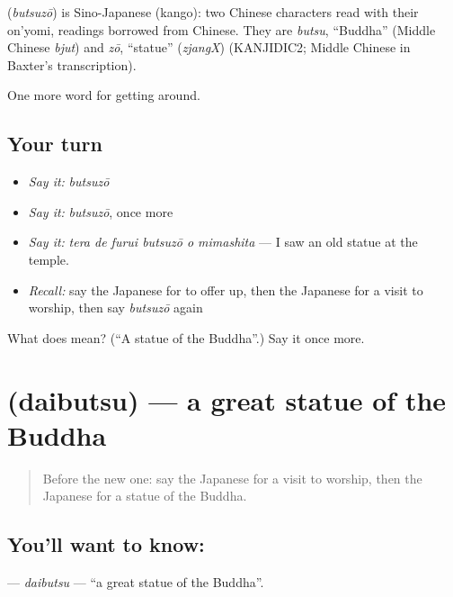 \begin{cousinweb}
\textbf{} (\emph{butsuzō}) is Sino-Japanese (kango): two Chinese characters read with their on'yomi, readings borrowed from Chinese. They are \emph{butsu}, \textquotedblleft{}Buddha\textquotedblright{} (Middle Chinese \emph{bjut}) and \emph{zō}, \textquotedblleft{}statue\textquotedblright{} (\emph{zjangX}) (KANJIDIC2; Middle Chinese in Baxter's transcription).
\end{cousinweb}

\begin{grammarlens}[title={What you've built}]
One more word for getting around.
\end{grammarlens}

\subsection*{Your turn}
\begin{itemize}
\raggedright
  \item \emph{Say it:} \emph{butsuzō}
  \item \emph{Say it:} \emph{butsuzō}, once more
  \item \emph{Say it:} \emph{tera de furui butsuzō o mimashita} — I saw an old statue at the temple.
  \item \emph{Recall:} say the Japanese for to offer up, then the Japanese for a visit to worship, then say \emph{butsuzō} again
\end{itemize}

\begin{tcolorbox}[breakable,colback=teal!4,colframe=teal!35!black,title={Before you move on}]
What does  mean? (\textquotedblleft{}A statue of the Buddha\textquotedblright{}.) Say it once more.
\end{tcolorbox}
\section[\texorpdfstring{\ja{だいぶつ} (daibutsu)}{だいぶつ (daibutsu)}]{ (daibutsu) — a great statue of the Buddha}

\label{lesson:JA-C407-daibutsu}



\begin{quote}
Before the new one: say the Japanese for a visit to worship, then the Japanese for a statue of the Buddha.
\end{quote}

\subsection*{You'll want to know: }
\textbf{} — \emph{daibutsu} — \textquotedblleft{}a great statue of the Buddha\textquotedblright{}.

